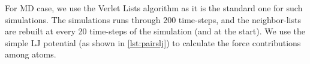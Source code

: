 \documentclass[preprint,12pt]{elsarticle}
\begin{document}

For \ac{MD} case, we use the Verlet Lists algorithm as it is the standard one for such simulations.
The simulations runs through 200 time-steps, and the neighbor-lists are rebuilt at every 20 time-steps of the simulation (and at the start).
We use the simple \ac{LJ} potential (as shown in \autoref{lst:pairslj}) to calculate the force contributions among atoms.

\end{document}
